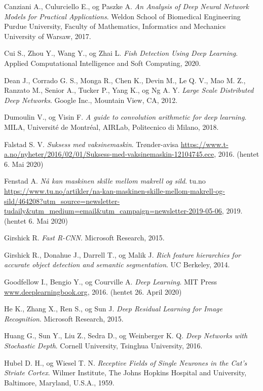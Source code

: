 \documentclass[11ot]{article}
\begin{document}
\begin{thebibliography}{9}
Canziani A., Culurciello E., og Paszke A. 
\textit{An Analysis of Deep Neural Network Models for Practical Applications}. 
Weldon School of Biomedical Engineering Purdue University, Faculty of Mathematics, Informatics and Mechanics University of Warsaw, 2017.

Cui S., Zhou Y., Wang Y., og Zhai L. 
\textit{Fish Detection Using Deep Learning}. 
Applied Computational Intelligence and Soft Computing, 2020.

Dean J., Corrado G. S., Monga R., Chen K., Devin M., Le Q. V., Mao M. Z., Ranzato M., Senior A., Tucker P., Yang K., og Ng A. Y. 
\textit{Large Scale Distributed Deep Networks}. 
Google Inc., Mountain View, CA, 2012.

Dumoulin V., og Visin F. 
\textit{A guide to convolution arithmetic for deep learning}. 
MILA, Université de Montréal, AIRLab, Politecnico di Milano, 2018.

Falstad S. V.
\textit{Suksess med vaksinemaskin}. 
Trønder-avisa \url{https://www.t-a.no/nyheter/2016/02/01/Suksess-med-vaksinemaskin-12104745.ece}, 2016. (hentet 6. Mai 2020)

Fenstad A.
\textit{Nå kan maskinen skille mellom makrell og sild}. 
tu.no \url{https://www.tu.no/artikler/na-kan-maskinen-skille-mellom-makrell-og-sild/464208?utm_source=newsletter-tudaily&utm_medium=email&utm_campaign=newsletter-2019-05-06}, 2019. (hentet 6. Mai 2020)

Girshick R. 
\textit{Fast R-CNN}. 
Microsoft Research, 2015.

Girshick R., Donahue J., Darrell T., og Malik J. 
\textit{Rich feature hierarchies for accurate object detection and semantic segmentation}. 
UC Berkeley, 2014.

Goodfellow I., Bengio Y., og Courville A. 
\textit{Deep Learning}. 
MIT Press \url{www.deeplearningbook.org}, 2016. (hentet 26. April 2020)

He K., Zhang X., Ren S., og Sun J. 
\textit{Deep Residual Learning for Image Recognition}. 
Microsoft Research, 2015.

Huang G., Sun Y., Liu Z., Sedra D., og Weinberger K. Q. 
\textit{Deep Networks with Stochastic Depth}. 
Cornell University, Tsinghua University, 2016.

Hubel D. H., og Wiesel T. N. 
\textit{Receptive Fields of Single Neurones in the Cat's Striate Cortex}. 
 Wilmer Institute, The Johns Hopkins Hospital and University, Baltimore, Maryland, U.S.A., 1959.
 

\end{thebibliography}
\end{document}

